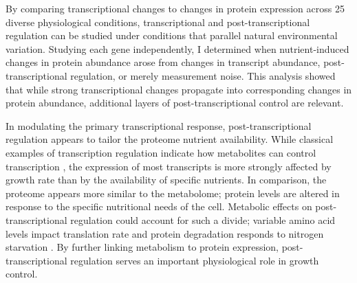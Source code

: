 By comparing transcriptional changes to changes in protein expression across 25 diverse physiological conditions, transcriptional and post-transcriptional regulation can be studied under conditions that parallel natural environmental variation.  Studying each gene independently, I determined when nutrient-induced changes in protein abundance arose from changes in transcript abundance, post-transcriptional regulation, or merely measurement noise. This analysis showed that while strong transcriptional changes propagate into corresponding changes in protein abundance, additional layers of post-transcriptional control are relevant.

In modulating the primary transcriptional response, post-transcriptional regulation appears to tailor the proteome nutrient availability. While classical examples of transcription regulation indicate how metabolites can control transcription \cite{Jacob:1961du, Jones:1982dn}, the expression of most transcripts is more strongly affected by growth rate than by the availability of specific nutrients.  In comparison, the proteome appears more similar to the metabolome; protein levels are altered in response to the specific nutritional needs of the cell. Metabolic effects on post-transcriptional regulation could account for such a divide; variable amino acid levels impact translation rate \cite{Klumpp:2009ic} and protein degradation responds to nitrogen starvation \cite{Zundel:2009dy, Xu:2013do}. By further linking metabolism to protein expression, post-transcriptional regulation serves an important physiological role in growth control.


